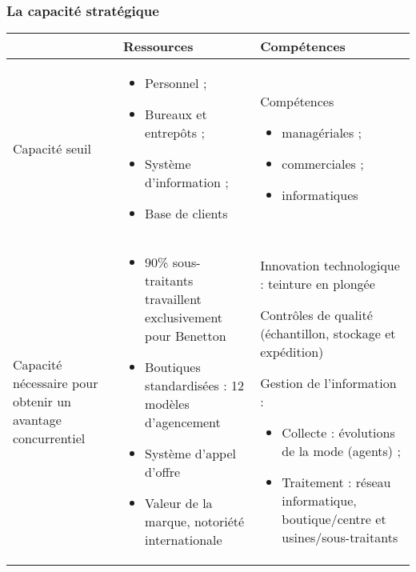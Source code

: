 	\subsubsection{La capacité stratégique}
		\begin{table}[!ht]
			\begin{center}
				\begin{tabular}{p{4cm}|p{5.5cm}|p{5.5cm}}
				& Ressources & Compétences \\ \hline
				Capacité seuil &
						\begin{itemize}
							\item Personnel ;
							\item Bureaux et entrepôts ;
							\item Système d'information ;
							\item Base de clients
						\end{itemize}
						&
						Compétences
						
						\begin{itemize}
							\item managériales ;
							\item commerciales ;
							\item informatiques
						\end{itemize}
				\\ \hline
				Capacité nécessaire pour obtenir un avantage concurrentiel
				&
						\begin{itemize}
							\item 90\% sous-traitants travaillent exclusivement pour Benetton
							\item Boutiques standardisées : 12 modèles d'agencement
							\item Système d'appel d'offre
							\item Valeur de la marque, notoriété internationale
						\end{itemize}
						&
						Innovation technologique : teinture en plongée
						
						Contrôles de qualité (échantillon, stockage et expédition)
						
						Gestion de l'information :
						\begin{itemize}
							\item Collecte : évolutions de la mode (agents) ;
							\item Traitement : réseau informatique, boutique/centre et usines/sous-traitants
						\end{itemize}
				\\
				\end{tabular}
			\end{center}
		\end{table}

